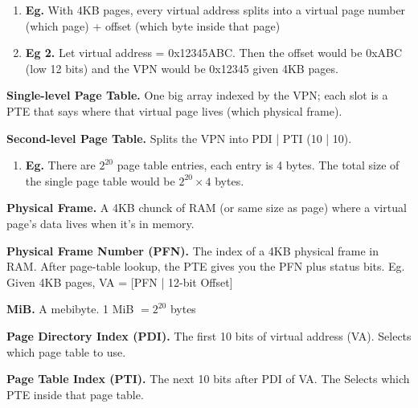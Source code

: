 \documentclass[12pt]{article}
\begin{document}
    \begin{enumerate}
        \item[]{\bf Eg.} {With 4KB pages, every virtual address splits into a virtual page number (which page) + offset (which byte inside that page)} \par

        \item[]{\bf Eg 2.} {Let virtual address = 0x12345ABC. Then the offset would be 0xABC (low 12 bits) and the VPN would be 0x12345 given 4KB pages.} 
    \end{enumerate}

\vspace{1em}
\setlength{\parindent}{0pt} 

    {\bf Single-level Page Table.} {One big array indexed by the VPN; each slot is a PTE that says where that virtual page lives (which physical frame).} \par

    {\bf Second-level Page Table.} {Splits the VPN into PDI | PTI (10 | 10).} \par

    \begin{enumerate}
        \item[]{\bf Eg.} {There are $2^{20}$ page table entries, each entry is 4 bytes. The total size of the single page table would be $2^{20} \times 4$ bytes.} \par
    \end{enumerate}

\vspace{1em}

    {\bf Physical Frame.} {A 4KB chunck of RAM (or same size as page) where a virtual page's data lives when it's in memory.} 

    {\bf Physical Frame Number (PFN).} {The index of a 4KB physical frame in RAM. After page-table lookup, the PTE gives you the PFN plus status bits. Eg. Given 4KB pages, VA = [PFN | 12-bit Offset]}

    {\bf MiB.} {A mebibyte. 1 MiB $= 2^{20}$ bytes} 

    {\bf Page Directory Index (PDI).} {The first 10 bits of virtual address (VA). Selects which page table to use.} \par

    {\bf Page Table Index (PTI).} {The next 10 bits after PDI of VA. The Selects which PTE inside that page table.} \par
 
\end{document}
